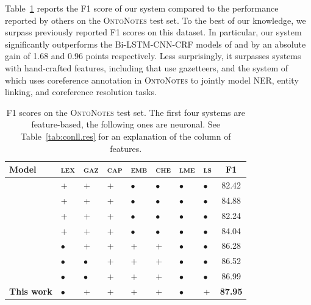 \documentclass[11pt]{article}
\newcommand{\onto}{\textsc{OntoNotes}}
\newcommand{\lll}{\textsc{lex}}
\newcommand{\ggg}{\textsc{gaz}}
\newcommand{\ccc}{\textsc{cap}}
\newcommand{\chhh}{\textsc{che}}
\newcommand{\eee}{\textsc{emb}}
\newcommand{\mmm}{\textsc{lme}}
\newcommand{\sss}{\textsc{ls}}
\begin{document}
	Table~\ref{tab:onto.res} reports the F1 score of our system compared to the performance reported by others on the \onto{} test set. To the best of our knowledge, we surpass previously reported F1 scores on this dataset. In particular, our system significantly outperforms the Bi-LSTM-CNN-CRF  models of \cite{chiu2015named} and \cite{strubell2017fast} by an absolute gain of 1.68 and 0.96 points respectively.  Less surprisingly, it surpasses systems with hand-crafted features, including  that use gazetteers, and the system of  which uses coreference annotation in \onto{} to jointly model NER, entity linking, and coreference resolution tasks. 
	
	
	\begin{table}[h]
		
		\begin{center}
			\setlength{\tabcolsep}{1mm}  
			\begin{tabular}{|l|lllllll|c|}
				\hline \textbf{Model} & \lll & \ggg & \ccc &\eee & \chhh & \mmm & \sss & \textbf{F1} \\ 
				\hline
				\cite{finkel2009joint} 						& \textsc{+}& \textsc{+}& \textsc{+} & $\bullet$&$\bullet$&$\bullet$&$\bullet$	& 82.42 \\
				\cite{ratinov2009design}  		& \textsc{+}& \textsc{+}& \textsc{+} & $\bullet$&$\bullet$&$\bullet$&$\bullet$	& 84.88 \\
				\cite{passos2014lexicon} 				        & \textsc{+}& \textsc{+}& \textsc{+} & $\bullet$&$\bullet$&$\bullet$&$\bullet$	& 82.24 \\
				\cite{durrett2014joint} 					& \textsc{+}& \textsc{+}& \textsc{+} & $\bullet$&$\bullet$&$\bullet$&$\bullet$	& 84.04 \\
				\hline 
				\cite{chiu2015named} & $\bullet$ & \textsc{+}& \textsc{+}& \textsc{+} & \textsc{+} &$\bullet$&$\bullet$	& 86.28 \\
				\cite{shen2017deep} & $\bullet$&$\bullet$ & \textsc{+}& \textsc{+}& \textsc{+} & $\bullet$ & $\bullet$	& 86.52 \\
				\cite{strubell2017fast} & $\bullet$&$\bullet$ & \textsc{+}& \textsc{+}& \textsc{+} & $\bullet$ & $\bullet$	& 86.99 \\
				
				\hline
				\textbf{This work} 	& $\bullet$& \textsc{+}& \textsc{+} & \textsc{+}& \textsc{+} & $\bullet$ 	& \textsc{+}	& \bf 87.95 \\
				\hline
			\end{tabular}
		\end{center}
		
		
		\caption{F1 scores on the \onto{} test set. The first four systems are feature-based, the following ones are neuronal. See Table~\ref{tab:conll.res} for an explanation of the column of features.}
		\label{tab:onto.res} 
		
	\end{table}
\end{document}
